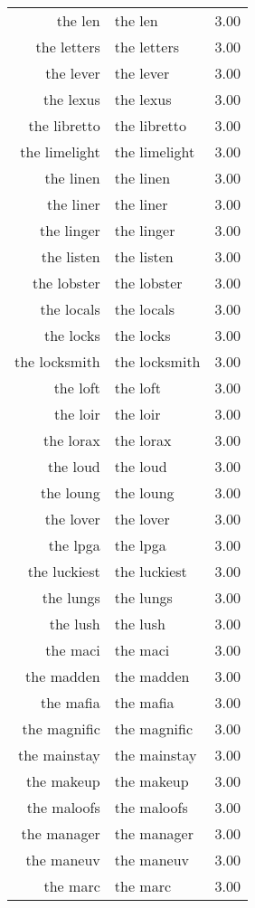 \begin{table}[ht]
\begin{tabular}{rlr}
  the len & the len & 3.00 \\ 
  the letters & the letters & 3.00 \\ 
  the lever & the lever & 3.00 \\ 
  the lexus & the lexus & 3.00 \\ 
  the libretto & the libretto & 3.00 \\ 
  the limelight & the limelight & 3.00 \\ 
  the linen & the linen & 3.00 \\ 
  the liner & the liner & 3.00 \\ 
  the linger & the linger & 3.00 \\ 
  the listen & the listen & 3.00 \\ 
  the lobster & the lobster & 3.00 \\ 
  the locals & the locals & 3.00 \\ 
  the locks & the locks & 3.00 \\ 
  the locksmith & the locksmith & 3.00 \\ 
  the loft & the loft & 3.00 \\ 
  the loir & the loir & 3.00 \\ 
  the lorax & the lorax & 3.00 \\ 
  the loud & the loud & 3.00 \\ 
  the loung & the loung & 3.00 \\ 
  the lover & the lover & 3.00 \\ 
  the lpga & the lpga & 3.00 \\ 
  the luckiest & the luckiest & 3.00 \\ 
  the lungs & the lungs & 3.00 \\ 
  the lush & the lush & 3.00 \\ 
  the maci & the maci & 3.00 \\ 
  the madden & the madden & 3.00 \\ 
  the mafia & the mafia & 3.00 \\ 
  the magnific & the magnific & 3.00 \\ 
  the mainstay & the mainstay & 3.00 \\ 
  the makeup & the makeup & 3.00 \\ 
  the maloofs & the maloofs & 3.00 \\ 
  the manager & the manager & 3.00 \\ 
  the maneuv & the maneuv & 3.00 \\ 
  the marc & the marc & 3.00 \\ 

\end{tabular}
\end{table}
